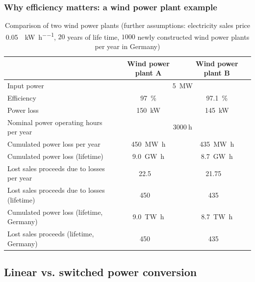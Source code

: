 \begin{frame}[c]
	\frametitle{Why efficiency matters: a wind power plant example}
	\begin{table}
		\centering
		\begin{tabular}{lcc}
			\toprule
			& Wind power plant A & Wind power plant B \\
			\midrule
			Input power & \multicolumn{2}{c}{\SI{5}{\mega\watt}} \pause\\
			Efficiency & \SI{97}{\percent} & \SI{97.1}{\percent}  \pause\\
			Power loss & \SI{150}{\kilo\watt} & \SI{145}{\kilo\watt}\pause\\
			\midrule
			Nominal power operating hours per year & \multicolumn{2}{c}{$\SI{3000}{\hour}$} \pause\\
			Cumulated power loss per year & \SI{450}{\mega\watt\hour} & \SI{435}{\mega\watt\hour} \pause\\
			Cumulated power loss (lifetime) & \SI{9.0}{\giga\watt\hour} & \SI{8.7}{\giga\watt\hour} \pause\\
			\midrule
			Lost sales proceeds due to losses per year  & \SI{22.5}{\kilo\EUR} & \SI{21.75}{\kilo\EUR} \pause\\
			Lost sales proceeds due to losses (lifetime)  & \SI{450}{\kilo\EUR} & \SI{435}{\kilo\EUR} \pause\\
			\midrule
			Cumulated power loss (lifetime, Germany)  & \SI{9.0}{\tera\watt\hour} & \SI{8.7}{\tera\watt\hour} \pause\\
			Lost sales proceeds (lifetime, Germany)  & \SI{450}{\mega\EUR} & \SI{435}{\mega\EUR} \\
			\bottomrule
		\end{tabular}
		\label{tab:efficiency_wind_power_example}
		\caption{Comparison of two wind power plants (further assumptions:  electricity sales price \SI[fraction-function=\nicefrac]{0.05}{\EUR\per\kilo\watt\per\hour}, $20$ years of life time, $\num{1000}$ newly constructed wind power plants per year in Germany)}
	\end{table}
\end{frame}

\subsection{Linear vs. switched power conversion}

